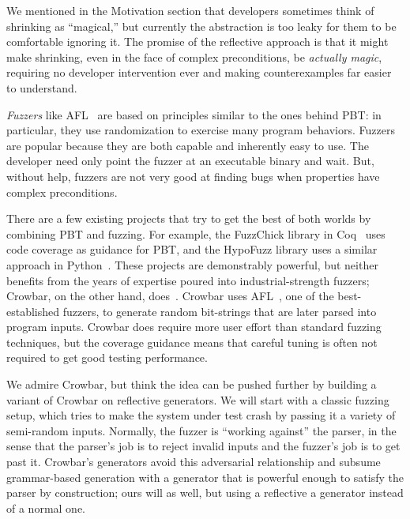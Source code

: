 We mentioned in the Motivation section that developers sometimes think of
shrinking as ``magical,'' but currently the abstraction is too leaky for them to
be comfortable ignoring it.  The promise of the reflective approach
is that it might make shrinking, even in the face of complex
preconditions, be {\em actually magic}, requiring no developer
intervention ever and making counterexamples far easier to understand.

{\em Fuzzers} like AFL~\cite{afl-readme} are based on principles
similar to the
ones behind PBT: in particular, they use randomization to exercise many
program behaviors. Fuzzers are popular because they are both capable and
inherently easy to use. The developer need only point the fuzzer at an
executable binary and
wait. But, without help, fuzzers are not very good at finding
bugs when properties have complex preconditions. 

There are a few existing projects that try to get the best of both worlds by
combining PBT and fuzzing.
For example, the FuzzChick library in Coq~\cite{OLDlampropoulos19fuzzchick}
uses code coverage as guidance for PBT, and the HypoFuzz library uses a
similar approach in Python~\cite{hatfield-dodds_hypofuzz_nodate}. These projects
are demonstrably powerful, but neither benefits from the years of expertise
poured into industrial-strength fuzzers; Crowbar, on the other hand,
does~\cite{dolan2017testing}. Crowbar uses
AFL~\cite{afl-readme}, one of the best-established
fuzzers, to generate random bit-strings that are later parsed into program
inputs. Crowbar does require more user effort than standard fuzzing techniques,
but the coverage guidance means that careful tuning is often not required to get
good testing performance.

We admire Crowbar, but think the idea can be pushed further by building
a variant of Crowbar on reflective generators.
We will start with a classic fuzzing setup, which tries to make the
system under test
crash by passing it a variety of semi-random inputs. Normally, the fuzzer is
``working against'' the parser, in the sense that the parser's job is to reject
invalid inputs and the fuzzer's job is to get past it.  Crowbar's
generators avoid this adversarial relationship and subsume grammar-based
generation with a generator that is powerful enough to satisfy the
parser by construction; ours will as well, but using a
reflective a generator instead of a normal one.

